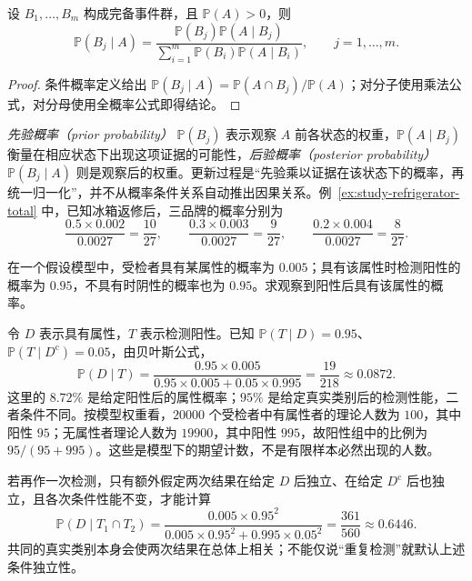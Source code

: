 \begin{theorem}[贝叶斯公式]
\label{thm:study-bayes}
设 $B_1,\ldots,B_m$ 构成完备事件群，且 $\mathbb P(A)>0$，则
\begin{equation}
 \mathbb P(B_j\mid A)
 =\frac{\mathbb P(B_j)\mathbb P(A\mid B_j)}
 {\sum_{i=1}^{m}\mathbb P(B_i)\mathbb P(A\mid B_i)},
 \qquad j=1,\ldots,m.
 \label{eq:study-bayes-formula}
\end{equation}
\end{theorem}

\begin{proof}
条件概率定义给出 $\mathbb P(B_j\mid A)=\mathbb P(A\cap B_j)/\mathbb P(A)$；对分子使用乘法公式，对分母使用全概率公式即得结论。
\end{proof}

\emph{先验概率（prior probability）} $\mathbb P(B_j)$ 表示观察 $A$ 前各状态的权重，$\mathbb P(A\mid B_j)$ 衡量在相应状态下出现这项证据的可能性，\emph{后验概率（posterior probability）} $\mathbb P(B_j\mid A)$ 则是观察后的权重。更新过程是“先验乘以证据在该状态下的概率，再统一归一化”，并不从概率条件关系自动推出因果关系。例~\ref{ex:study-refrigerator-total} 中，已知冰箱返修后，三品牌的概率分别为
\[
 \frac{0.5\times0.002}{0.0027}=\frac{10}{27},\qquad
 \frac{0.3\times0.003}{0.0027}=\frac{9}{27},\qquad
 \frac{0.2\times0.004}{0.0027}=\frac{8}{27}.
\]

\begin{example}
\label{ex:study-screening-bayes}
在一个假设模型中，受检者具有某属性的概率为 $0.005$；具有该属性时检测阳性的概率为 $0.95$，不具有时阴性的概率也为 $0.95$。求观察到阳性后具有该属性的概率。
\end{example}

\begin{solve}
令 $D$ 表示具有属性，$T$ 表示检测阳性。已知 $\mathbb P(T\mid D)=0.95$、$\mathbb P(T\mid D^{\mathrm c})=0.05$，由贝叶斯公式，
\begin{equation}
 \mathbb P(D\mid T)
 =\frac{0.95\times0.005}{0.95\times0.005+0.05\times0.995}
 =\frac{19}{218}\approx0.0872.
 \label{eq:study-screening-posterior}
\end{equation}
这里的 $8.72\%$ 是给定阳性后的属性概率；$95\%$ 是给定真实类别后的检测性能，二者条件不同。按模型权重看，$20000$ 个受检者中有属性者的理论人数为 $100$，其中阳性 $95$；无属性者理论人数为 $19900$，其中阳性 $995$，故阳性组中的比例为 $95/(95+995)$。这些是模型下的期望计数，不是有限样本必然出现的人数。

若再作一次检测，只有额外假定两次结果在给定 $D$ 后独立、在给定 $D^{\mathrm c}$ 后也独立，且各次条件性能不变，才能计算
\[
 \mathbb P(D\mid T_1\cap T_2)
 =\frac{0.005\times0.95^2}
 {0.005\times0.95^2+0.995\times0.05^2}
 =\frac{361}{560}\approx0.6446.
\]
共同的真实类别本身会使两次结果在总体上相关；不能仅说“重复检测”就默认上述条件独立性。
\end{solve}

